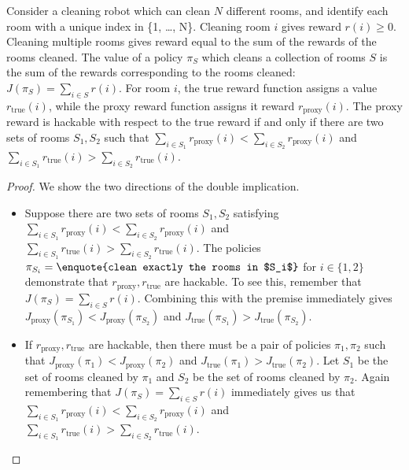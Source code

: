 \label{app:cleaning_robot}
\begin{proposition}
    Consider a cleaning robot which can clean 
$N$ different rooms, and identify each room with 
a unique index in \{1, \ldots, N\}. Cleaning
room $i$ gives reward $r(i) \geq 0$. Cleaning multiple
rooms gives reward equal to the
sum of the rewards of the rooms cleaned.
The value
of a policy $\pi_S$ which cleans 
a collection of rooms
$S$
is the sum of the rewards corresponding
to the rooms cleaned:
$J(\pi_S) = \sum_{i \in S} r(i)$.
For room $i$,
the true reward function assigns a value
$r_\text{true}(i)$, while the
proxy reward function assigns it reward $r_\text{proxy}(i)$. 
The proxy reward
is hackable with respect to the true reward if and only if
there are two sets of rooms $S_1, S_2$ such that 
$\sum_{i \in S_1} r_\text{proxy}(i) < \sum_{i \in S_2} r_\text{proxy}(i)$
and 
$\sum_{i \in S_1} r_\text{true}(i) > \sum_{i \in S_2} r_\text{true}(i)$.
\label{prop:cleaning}
\end{proposition}

\begin{proof}
    We show the two directions of the double implication.
    \begin{itemize}
        \item[$\Leftarrow$]
        Suppose there are two sets of rooms $S_1, S_2$ satisfying
        $\sum_{i \in S_1} r_\text{proxy}(i) < \sum_{i \in S_2} r_\text{proxy}(i)$
        and 
        $\sum_{i \in S_1} r_\text{true}(i) > \sum_{i \in S_2} r_\text{true}(i)$.
        The policies
        $\pi_{S_i} = \text{\enquote{clean exactly the rooms in $S_i$}}$
        for $i \in \{1, 2\}$ demonstrate that $r_\text{proxy}, r_\text{true}$ are hackable.
        To see this, remember that $J(\pi_S) = \sum_{i \in S} r(i)$.
        Combining this with the premise immediately gives
        $J_\text{proxy}(\pi_{S_1}) < J_\text{proxy}(\pi_{S_2})$
        and $J_\text{true}(\pi_{S_1}) > J_\text{true}(\pi_{S_2})$.
        
        \item[$\Rightarrow$]
        If $r_\text{proxy}, r_\text{true}$ are hackable, then there must be a pair of policies $\pi_1, \pi_2$ such that $J_\text{proxy}(\pi_1) < J_\text{proxy}(\pi_2)$
        and $J_\text{true}(\pi_1) > J_\text{true}(\pi_2)$. Let $S_1$ be the set
        of rooms cleaned by $\pi_1$ and $S_2$ be the set
        of rooms cleaned by $\pi_2$. 
        Again remembering that
        $J(\pi_S) = \sum_{i \in S} r(i)$
        immediately gives us that
        $\sum_{i \in S_1} r_\text{proxy}(i) < \sum_{i \in S_2} r_\text{proxy}(i)$
        and 
        $\sum_{i \in S_1} r_\text{true}(i) > \sum_{i \in S_2} r_\text{true}(i)$.
    \end{itemize}
\end{proof}

